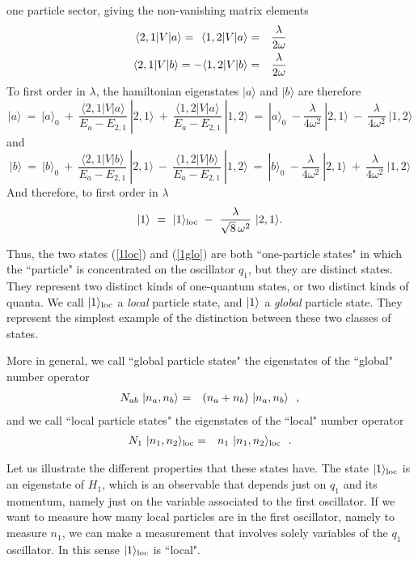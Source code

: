 \documentclass[10pt, nofootinbib]{revtex4}
\newcommand{\be}{\begin{equation}}
\newcommand{\ee}{\end{equation}}
\newcommand{\bea}{\begin{eqnarray}}
\newcommand{\eea}{\end{eqnarray}}
\begin{document}
one particle sector, giving the non-vanishing matrix elements
\begin{eqnarray}
\langle 2,1 |V| a \rangle = \hskip4pt
\langle 1,2 |V| a \rangle &=& \frac{\lambda}{2 \omega}\\
\langle 2,1 |V| b \rangle = 
- \langle 1,2 |V| b \rangle &=& \frac{\lambda}{2 \omega}
\end{eqnarray}
To first order in $\lambda$, the hamiltonian eigenstates $| a
\rangle$ and $| b \rangle$ are therefore
\begin{equation} 
|a\rangle\ =\ |a\rangle_{0}\ +\ \frac{\langle 2,1 |V| a
\rangle}{E_{a}-E_{2,1}}\ |2,1\rangle \ +\ \frac{\langle 1,2 |V| a
\rangle}{E_{a}-E_{2,1}}\ |1,2\rangle\ =\  |a\rangle_{0}\ 
-\frac{\lambda}{4\omega^2}\
| 2, 1 \rangle \ -\ \frac{\lambda}{4\omega^2}\ | 1, 2 \rangle
\end{equation}
and
\begin{equation} 
|b\rangle\ =\ |b\rangle_{0}\ +\ \frac{\langle 2,1 |V| b
\rangle}{E_{a}-E_{2,1}}\ |2,1\rangle\ -\ \frac{\langle 1,2 |V| b
\rangle}{E_{a}-E_{2,1}}\ |1,2\rangle\ =\ |b\rangle_{0}\ 
-\frac{\lambda}{4\omega^2}\
| 2, 1 \rangle \ +\ \frac{\lambda}{4\omega^2}\ | 1, 2 \rangle
\end{equation}
And therefore, to first order in $\lambda$
%
\be 
|1\rangle\ =\ |1\rangle_{\rm loc}\ -\
\frac{\lambda}{\sqrt{8}\, \omega^2}\ |2,1\rangle.
\ee
%

Thus, the two states (\ref{1loc}) and (\ref{1glo}) are both ``one-particle
states" in which the ``particle" is concentrated on the oscillator
$q_{1}$, but they are distinct states.  They represent two distinct
kinds of one-quantum states, or two distinct kinds of quanta.  We call
$|1\rangle_{\rm loc}$ a \emph{local} particle state, and
$|1\rangle_{\rm }$ a \emph{global} particle state.  They represent the
simplest example of the distinction between these two classes of
states.

More in general, we call ``global particle states" the
eigenstates of the ``global" number operator
%
\bea 
N_{ab}\ |n_{a},n_{b}\rangle_{\rm } &=& (n_{a}+n_{b})\
|n_{a},n_{b}\rangle\ \ , 
\eea
%
and we call ``local particle states" the eigenstates of the ``local"
number operator
%
\bea 
N_{1}\ |n_{1},n_{2}\rangle_{\rm loc} &=& n_{1}\
|n_{1},n_{2}\rangle_{\rm loc} \ \ .
\eea
%

Let us illustrate the different properties that these states have. 
The state $|1\rangle_{\rm loc}$ is an eigenstate of $H_{1}$, which is
an observable that depends just on $q_{1}$ and its momentum, namely
just on the variable associated to the first oscillator.  If we want
to measure how many local particles are in the first oscillator,
namely to measure $n_{1}$, we can make a measurement that involves
solely variables of the $q_{1}$ oscillator.  In this sense
$|1\rangle_{\rm loc}$ is ``local".
\end{document}
